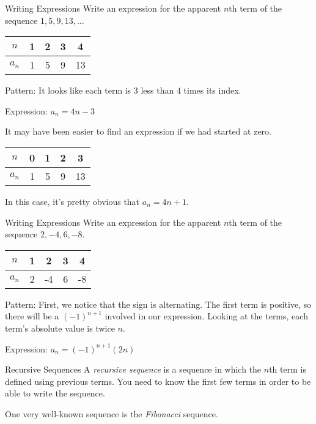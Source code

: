 \documentclass[t]{beamer}
\begin{document}
	\begin{frame}{Writing Expressions}
		Write an expression for the apparent $n$th term of the sequence $1, 5, 9, 13, \dots$ \pause
		
		\begin{tabular}{c|cccc}
			$n$ & 1 & 2 & 3 & 4 \\ \hline
			$a_n$ & 1 & 5 & 9 & 13
		\end{tabular} \pause
	
		Pattern: It looks like each term is $3$ less than $4$ times its index. \pause
		
		Expression: $a_n = 4n-3$ \pause
		
		It may have been easier to find an expression if we had started at zero. \pause
		
		\begin{tabular}{c|cccc}
			$n$ & 0 & 1 & 2 & 3 \\ \hline
			$a_n$ & 1 & 5 & 9 & 13
		\end{tabular} \pause
	
		In this case, it's pretty obvious that $a_n = 4n + 1$.
	\end{frame}

	\begin{frame}{Writing Expressions}
		Write an expression for the apparent $n$th term of the sequence $2, -4, 6, -8$. \pause
		
		\begin{tabular}{c|cccc}
			$n$ & 1 & 2 & 3 & 4 \\ \hline
			$a_n$ & 2 & -4 & 6 & -8
		\end{tabular} \pause
	
		Pattern: First, we notice that the sign is alternating. The first term is positive, so there will be a $(-1)^{n+1}$ involved in our expression. \pause Looking at the terms, each term's absolute value is twice $n$. \pause
		
		Expression: $a_n = (-1)^{n+1}(2n)$
	\end{frame}

	\begin{frame}{Recursive Sequences}
		A \textit{recursive sequence} is a sequence in which the $n$th term is defined using previous terms. You need to know the first few terms in order to be able to write the sequence.
		
		One very well-known sequence is the \textit{Fibonacci} sequence.
	\end{frame}
\end{document}

